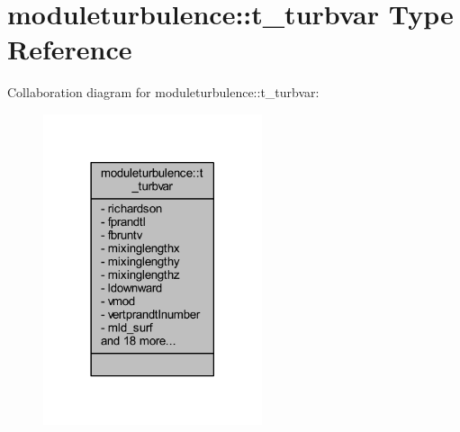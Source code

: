 \hypertarget{structmoduleturbulence_1_1t__turbvar}{}\section{moduleturbulence\+:\+:t\+\_\+turbvar Type Reference}
\label{structmoduleturbulence_1_1t__turbvar}


Collaboration diagram for moduleturbulence\+:\+:t\+\_\+turbvar\+:\nopagebreak
\begin{figure}[H]
\begin{center}
\leavevmode
\includegraphics[width=182pt]{structmoduleturbulence_1_1t__turbvar__coll__graph}
\end{center}
\end{figure}
